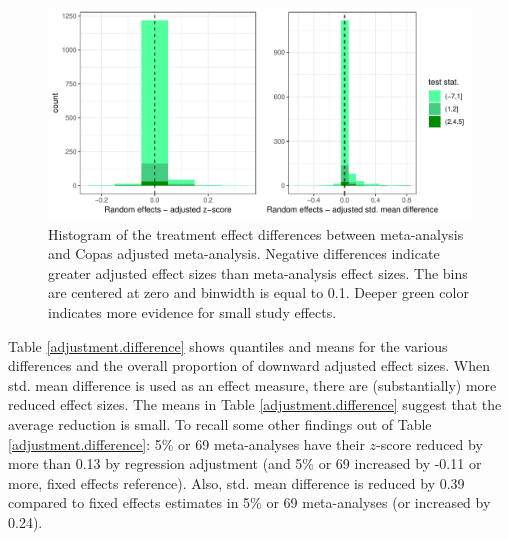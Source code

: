 \documentclass[11pt,a4paper,twoside]{book}\usepackage[]{graphicx}\usepackage[]{color}
\newenvironment{knitrout}{}{} %
\begin{document}
\begin{figure}
\begin{knitrout}
\color{fgcolor}

{\centering \includegraphics[width=\textwidth-3cm]{figure/ch03_figunnamed-chunk-22-1} 

}



\end{knitrout}
\caption{Histogram of the treatment effect differences between meta-analysis and Copas adjusted meta-analysis. Negative differences indicate greater adjusted effect sizes than meta-analysis effect sizes. The bins are centered at zero and binwidth is equal to 0.1. Deeper green color indicates more evidence for small study effects.}
\label{fig:adjustment.copas}
\end{figure}

Table \ref{adjustment.difference} shows quantiles and means for the various differences and the overall proportion of downward adjusted effect sizes. When std. mean difference is used as an effect measure, there are (substantially) more reduced effect sizes. The means in Table \ref{adjustment.difference} suggest that the average reduction is small. To recall some other findings out of Table \ref{adjustment.difference}: 5\% or 69 meta-analyses have their $z$-score reduced by more than 0.13 by regression adjustment (and 5\% or 69 increased by -0.11 or more, fixed effects reference). Also, std. mean difference is reduced by 0.39 compared to fixed effects estimates in 5\% or 69 meta-analyses (or increased by 0.24). 
\end{document}
